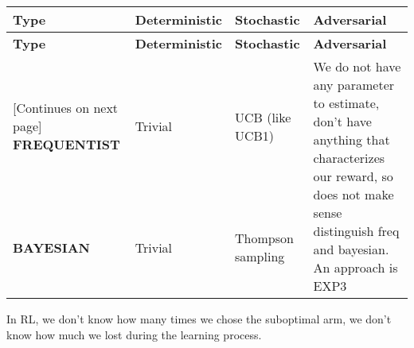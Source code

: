     \begin{tabularx}{\linewidth}{X X X X}
        \toprule
        \textbf{Type} & \textbf{Deterministic} & \textbf{Stochastic} & \textbf{Adversarial}\\
        \midrule
        \endfirsthead
        \toprule
        \textbf{Type} & \textbf{Deterministic} & \textbf{Stochastic} & \textbf{Adversarial}\\
        \midrule
        \endhead
        \midrule
        \footnotesize [Continues on next page]
        \endfoot
        \bottomrule
        \endlastfoot
        \textbf{FREQUENTIST} & Trivial & UCB (like UCB1) & \multirow{2}{5.5cm}{We do not have any parameter to estimate, don't have anything that characterizes our reward, so does not make sense distinguish freq and bayesian. An approach is EXP3}\\[4ex] \cmidrule{1-3}
        \textbf{BAYESIAN } & Trivial & Thompson sampling \\[4ex]
    \end{tabularx}
    In RL, we don't know how many times we chose the suboptimal arm, we don't know how much we lost during the learning process.

